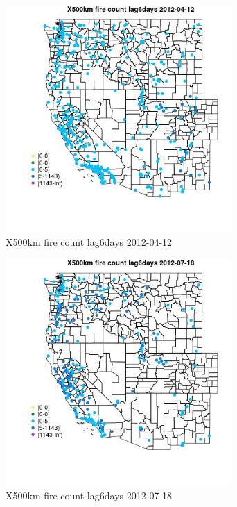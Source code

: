 \begin{figure} 
\centering  
\includegraphics[width=0.77\textwidth]{Code_Outputs/Report_ML_input_PM25_Step4_part_e_de_duplicated_aves_compiled_2019-05-14wNAs_MapObsX500km_fire_count_lag6days2012-04-12.jpg} 
\caption{\label{fig:Report_ML_input_PM25_Step4_part_e_de_duplicated_aves_compiled_2019-05-14wNAsMapObsX500km_fire_count_lag6days2012-04-12}X500km fire count lag6days 2012-04-12} 
\end{figure} 
 

\clearpage 

\begin{figure} 
\centering  
\includegraphics[width=0.77\textwidth]{Code_Outputs/Report_ML_input_PM25_Step4_part_e_de_duplicated_aves_compiled_2019-05-14wNAs_MapObsX500km_fire_count_lag6days2012-07-18.jpg} 
\caption{\label{fig:Report_ML_input_PM25_Step4_part_e_de_duplicated_aves_compiled_2019-05-14wNAsMapObsX500km_fire_count_lag6days2012-07-18}X500km fire count lag6days 2012-07-18} 
\end{figure} 
 

